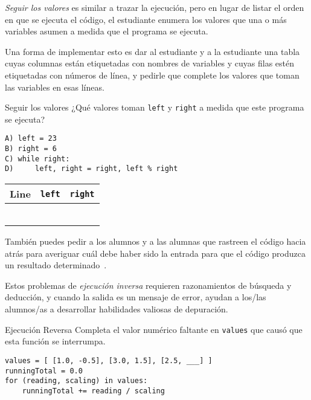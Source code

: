 \emph{Seguir los valores} es similar a trazar la ejecución, 
pero en lugar de listar el orden en que se ejecuta el código, 
el estudiante enumera los valores que una o más variables asumen
 a medida que el programa se ejecuta.

Una forma de implementar esto es dar al estudiante y a la estudiante una tabla 
cuyas columnas están etiquetadas con nombres de variables 
y cuyas filas estén etiquetadas con números de línea, 
y pedirle que complete los valores que toman las variables en esas líneas.

\newpage
\begin{aside}{Seguir los valores}
  ¿Qué valores toman \texttt{left} y \texttt{right} a medida que este programa se ejecuta?

\begin{verbatim}
A) left = 23
B) right = 6
C) while right:
D)     left, right = right, left % right
\end{verbatim}
\end{aside}

\begin{center}
\begin{tabular}{|l|l|l|}
  \hline
  Line & \texttt{left} & \texttt{right} \\
  \hline
  & & \\
  \hline
  & & \\
  \hline
  & & \\
  \hline
  & & \\
  \hline
  & & \\
  \hline
  & & \\
  \hline
\end{tabular}
\end{center}

También puedes pedir a los alumnos y a las alumnas que rastreen el código hacia atrás para averiguar cuál debe haber sido la entrada para que el código produzca un resultado determinado~\cite{Armo2008}.


Estos problemas de  \emph{ejecución inversa} requieren razonamientos de búsqueda y deducción, 
y cuando la salida es un mensaje de error, 
ayudan a los/las alumnos/as a desarrollar habilidades valiosas de depuración.

\begin{aside}{Ejecución Reversa}
  Completa el valor numérico faltante en \texttt{values}
  que causó que esta función se interrumpa.

\begin{verbatim}
values = [ [1.0, -0.5], [3.0, 1.5], [2.5, ___] ]
runningTotal = 0.0
for (reading, scaling) in values:
    runningTotal += reading / scaling
\end{verbatim}
\end{aside}

